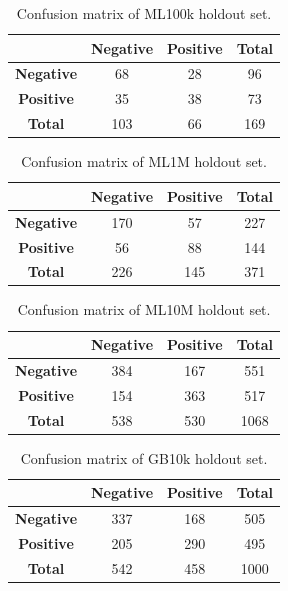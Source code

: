 \begin{table}[H]
\centering
\begin{tabular}{c | c | c | c}
\toprule
 & \textbf{Negative} & \textbf{Positive} & \textbf{Total} \\
\midrule
\textbf{Negative} & 68 & 28 & 96 \\
\midrule
\textbf{Positive} & 35 & 38 & 73 \\
\midrule
\textbf{Total} & 103 & 66 & 169 \\
\bottomrule
\end{tabular}
\caption[MovieLens 100k confusion matrix]{Confusion matrix of ML100k holdout set.}
\label{tab:ml100k-confusion-matrix}
\end{table}

\begin{table}[H]
\centering
\begin{tabular}{c | c | c | c}
\toprule
 & \textbf{Negative} & \textbf{Positive} & \textbf{Total} \\
\midrule
\textbf{Negative} & 170 & 57 & 227 \\
\midrule
\textbf{Positive} & 56 & 88 & 144 \\
\midrule
\textbf{Total} & 226 & 145 & 371 \\
\bottomrule
\end{tabular}
\caption[MovieLens 1M confusion matrix]{Confusion matrix of ML1M holdout set.}
\label{tab:ml1m-confusion-matrix}
\end{table}

\begin{table}[H]
\centering
\begin{tabular}{c | c | c | c}
\toprule
 & \textbf{Negative} & \textbf{Positive} & \textbf{Total} \\
\midrule
\textbf{Negative} & 384 & 167 & 551 \\
\midrule
\textbf{Positive} & 154 & 363 & 517 \\
\midrule
\textbf{Total} & 538 & 530 & 1068 \\
\bottomrule
\end{tabular}
\caption[MovieLens 10M confusion matrix]{Confusion matrix of ML10M holdout set.}
\label{tab:ml10m-confusion-matrix}
\end{table}

\begin{table}[H]
\centering
\begin{tabular}{c | c | c | c}
\toprule
 & \textbf{Negative} & \textbf{Positive} & \textbf{Total} \\
\midrule
\textbf{Negative} & 337 & 168 & 505 \\
\midrule
\textbf{Positive} & 205 & 290 & 495 \\
\midrule
\textbf{Total} & 542 & 458 & 1000 \\
\bottomrule
\end{tabular}
\caption[Goodbooks-10k confusion matrix]{Confusion matrix of GB10k holdout set.}
\label{tab:gb10k-confusion-matrix}
\end{table}


